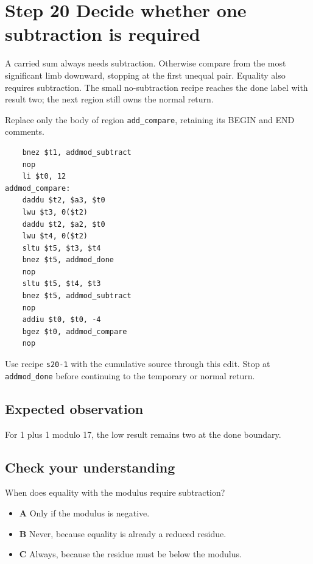 \section{Step 20 Decide whether one subtraction is required}\label{rsa-s20}

A carried sum always needs subtraction. Otherwise compare from the most significant limb downward, stopping at the first unequal pair. Equality also requires subtraction. The small no-subtraction recipe reaches the done label with result two; the next region still owns the normal return.

Replace only the body of region \texttt{add\_compare}, retaining its BEGIN and END comments.

\begin{verbatim}
    bnez $t1, addmod_subtract
    nop
    li $t0, 12
addmod_compare:
    daddu $t2, $a3, $t0
    lwu $t3, 0($t2)
    daddu $t2, $a2, $t0
    lwu $t4, 0($t2)
    sltu $t5, $t3, $t4
    bnez $t5, addmod_done
    nop
    sltu $t5, $t4, $t3
    bnez $t5, addmod_subtract
    nop
    addiu $t0, $t0, -4
    bgez $t0, addmod_compare
    nop
\end{verbatim}

Use recipe \texttt{s20-1} with the cumulative source through this edit. Stop at \texttt{addmod\_done} before continuing to the temporary or normal return.

\subsection{Expected observation}
For 1 plus 1 modulo 17, the low result remains two at the done boundary.

\subsection{Check your understanding}
When does equality with the modulus require subtraction?

\begin{itemize}
  \item \textbf{A} Only if the modulus is negative.
  \item \textbf{B} Never, because equality is already a reduced residue.
  \item \textbf{C} Always, because the residue must be below the modulus.
\end{itemize}
